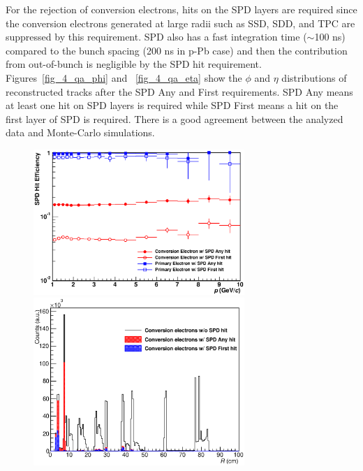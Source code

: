 {For the rejection of conversion electrons, hits on the SPD layers are required since the conversion electrons generated at large radii such as SSD, SDD, and TPC are suppressed by this requirement. 
SPD also has a fast integration time ($\sim$100 ns) compared to the bunch spacing (200 ns in p-Pb case) and then the contribution from out-of-bunch is negligible by the SPD hit requirement. 
Figures~\ref{fig_4_qa_phi} and ~\ref{fig_4_qa_eta} show the $\phi$ and $\eta$ distributions of reconstructed tracks after the SPD Any and First requirements. 
SPD Any means at least one hit on SPD layers is required while SPD First means a hit on the first layer of SPD is required. 
There is a good agreement between the analyzed data and Monte-Carlo simulations. 

\begin{figure}[h]
 \begin{minipage}{0.5\hsize}
  \begin{center}
  \includegraphics[width=8cm]{chap4/figure/TrackQA/SPDHit/SPDHitEff_PrimeConv_MB.eps}
  \end{center}
 \end{minipage}
 \begin{minipage}{0.5\hsize}
  \begin{center}
    \includegraphics[width=8cm]{chap4/figure/TrackQA/SPDHit/ConvRDistSPDDep_LHC13b2efix2.eps}
  \end{center}

\end{minipage}
\end{figure}}
